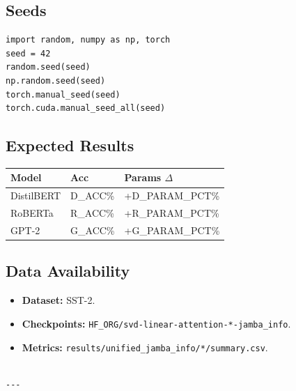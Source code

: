 \subsection{Seeds}

\begin{lstlisting}
import random, numpy as np, torch
seed = 42
random.seed(seed)
np.random.seed(seed)
torch.manual_seed(seed)
torch.cuda.manual_seed_all(seed)
\end{lstlisting}

\subsection{Expected Results}

\begin{table}[H]
\centering
\small
\begin{tabular}{lll}
\toprule
\textbf{Model} & \textbf{Acc} & \textbf{Params $\Delta$} \\
\midrule
DistilBERT & {{D\_ACC}}\% & +{{D\_PARAM\_PCT}}\% \\
RoBERTa & {{R\_ACC}}\% & +{{R\_PARAM\_PCT}}\% \\
GPT-2 & {{G\_ACC}}\% & +{{G\_PARAM\_PCT}}\% \\
\bottomrule
\end{tabular}
\end{table}

\subsection{Data Availability}

\begin{itemize}
\item \textbf{Dataset:} SST-2.
\item \textbf{Checkpoints:} \texttt{{{HF\_ORG}}/svd-linear-attention-*-jamba\_info}.
\item \textbf{Metrics:} \texttt{results/unified\_jamba\_info/*/summary.csv}.
\end{itemize}
\begin{lstlisting}

---
\end{lstlisting}